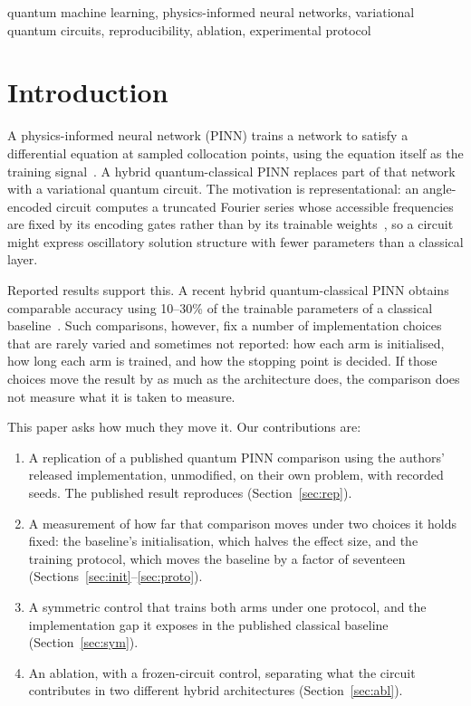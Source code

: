 \documentclass[conference,a4paper]{IEEEtran}
\begin{document}
\begin{IEEEkeywords}
quantum machine learning, physics-informed neural networks, variational quantum circuits,
reproducibility, ablation, experimental protocol
\end{IEEEkeywords}

\section{Introduction}

A physics-informed neural network (PINN) trains a network to satisfy a differential
equation at sampled collocation points, using the equation itself as the training
signal~\cite{raissi}. A hybrid quantum-classical PINN replaces part of that network with a
variational quantum circuit. The motivation is representational: an angle-encoded circuit
computes a truncated Fourier series whose accessible frequencies are fixed by its encoding
gates rather than by its trainable weights~\cite{schuld}, so a circuit might express
oscillatory solution structure with fewer parameters than a classical layer.

Reported results support this. A recent hybrid quantum-classical PINN obtains comparable
accuracy using 10--30\% of the trainable parameters of a classical
baseline~\cite{qcpinn}. Such comparisons, however, fix a number of implementation choices
that are rarely varied and sometimes not reported: how each arm is initialised, how long
each arm is trained, and how the stopping point is decided. If those choices move the
result by as much as the architecture does, the comparison does not measure what it is
taken to measure.

This paper asks how much they move it. Our contributions are:

\begin{enumerate}
\item A replication of a published quantum PINN comparison using the authors' released
implementation, unmodified, on their own problem, with recorded seeds. The published
result reproduces (Section~\ref{sec:rep}).
\item A measurement of how far that comparison moves under two choices it holds fixed:
the baseline's initialisation, which halves the effect size, and the training protocol,
which moves the baseline by a factor of seventeen
(Sections~\ref{sec:init}--\ref{sec:proto}).
\item A symmetric control that trains both arms under one protocol, and the implementation
gap it exposes in the published classical baseline (Section~\ref{sec:sym}).
\item An ablation, with a frozen-circuit control, separating what the circuit contributes
in two different hybrid architectures (Section~\ref{sec:abl}).
\end{enumerate}
\end{document}
